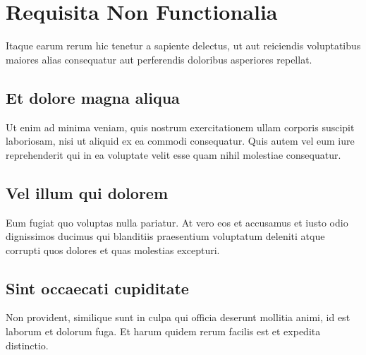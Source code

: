 \section{Requisita Non Functionalia}

Itaque earum rerum hic tenetur a sapiente delectus, ut aut reiciendis voluptatibus maiores alias consequatur aut perferendis doloribus asperiores repellat.

\subsection{Et dolore magna aliqua}
Ut enim ad minima veniam, quis nostrum exercitationem ullam corporis suscipit laboriosam, nisi ut aliquid ex ea commodi consequatur. Quis autem vel eum iure reprehenderit qui in ea voluptate velit esse quam nihil molestiae consequatur.

\subsection{Vel illum qui dolorem}
Eum fugiat quo voluptas nulla pariatur. At vero eos et accusamus et iusto odio dignissimos ducimus qui blanditiis praesentium voluptatum deleniti atque corrupti quos dolores et quas molestias excepturi.

\subsection{Sint occaecati cupiditate}
Non provident, similique sunt in culpa qui officia deserunt mollitia animi, id est laborum et dolorum fuga. Et harum quidem rerum facilis est et expedita distinctio.